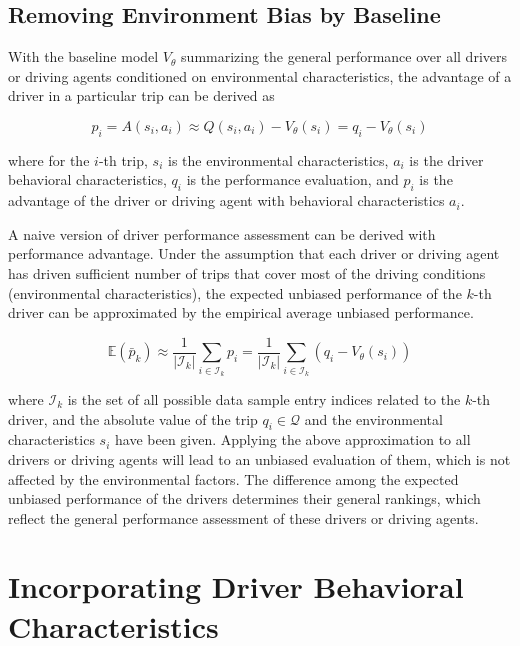 \documentclass{article}
\begin{document}
\subsection{Removing Environment Bias by Baseline}\label{sec:removing_environment_bias}

With the baseline model $ V_{\theta} $ summarizing the general performance over all drivers or driving agents conditioned on environmental characteristics, the advantage of a driver in a particular trip can be derived as

\[
p_{i} = A(s_{i}, a_{i}) \approx Q(s_{i}, a_{i}) - V_{\theta}(s_{i}) = q_{i} - V_{\theta}(s_{i})
\]

where for the $i$-th trip, $ s_{i} $ is the environmental characteristics, $ a_{i} $ is the driver behavioral characteristics, $ q_{i} $ is the performance evaluation, and $ p_{i} $ is the advantage of the driver or driving agent with behavioral characteristics $ a_{i} $.

A naive version of driver performance assessment can be derived with performance advantage. Under the assumption that each driver or driving agent has driven sufficient number of trips that cover most of the driving conditions (environmental characteristics), the expected unbiased performance of the $k$-th driver can be approximated by the empirical average unbiased performance.

\[
\mathbb{E}(\bar{p}_{k}) \approx \frac{1}{ | \mathcal{I}_{k} | } \sum_{ i \in \mathcal{I}_{k} } p_{i} = \frac{1}{ | \mathcal{I}_{k} | } \sum_{ i \in \mathcal{I}_{k} } \left( q_{i} - V_{\theta}(s_{i}) \right)
\]

where $ \mathcal{I}_{k} $ is the set of all possible data sample entry indices related to the $k$-th driver, and the absolute value of the trip $ q_{i} \in \mathcal{Q} $ and the environmental characteristics $ s_{i} $ have been given. Applying the above approximation to all drivers or driving agents will lead to an unbiased evaluation of them, which is not affected by the environmental factors. The difference among the expected unbiased performance of the drivers determines their general rankings, which reflect the general performance assessment of these drivers or driving agents.


\section{Incorporating Driver Behavioral Characteristics}\label{sec:incorporating_driver_behavioral_characteristics}
\end{document}
